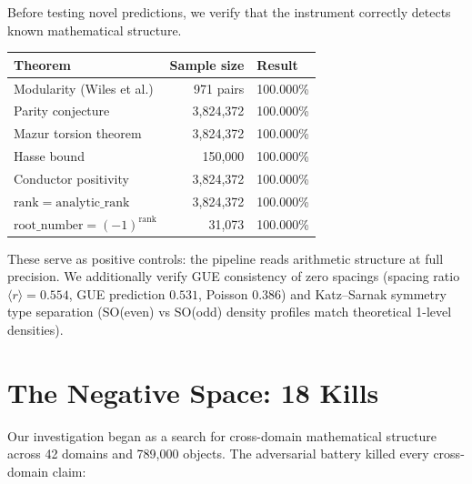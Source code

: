 \documentclass[11pt,a4paper]{article}
\begin{document}
Before testing novel predictions, we verify that the instrument correctly detects known mathematical structure.

\begin{center}
\begin{tabular}{lrl}
\toprule
\textbf{Theorem} & \textbf{Sample size} & \textbf{Result} \\
\midrule
Modularity (Wiles et al.) & 971 pairs & 100.000\% \\
Parity conjecture & 3,824,372 & 100.000\% \\
Mazur torsion theorem & 3,824,372 & 100.000\% \\
Hasse bound & 150,000 & 100.000\% \\
Conductor positivity & 3,824,372 & 100.000\% \\
$\mathrm{rank} = \mathrm{analytic\_rank}$ & 3,824,372 & 100.000\% \\
$\mathrm{root\_number} = (-1)^{\mathrm{rank}}$ & 31,073 & 100.000\% \\
\bottomrule
\end{tabular}
\end{center}

These serve as positive controls: the pipeline reads arithmetic structure at full precision. We additionally verify GUE consistency of zero spacings (spacing ratio $\langle r \rangle = 0.554$, GUE prediction $0.531$, Poisson $0.386$) and Katz--Sarnak symmetry type separation (SO(even) vs SO(odd) density profiles match theoretical 1-level densities).

\section{The Negative Space: 18 Kills}
\label{sec:kills}

Our investigation began as a search for cross-domain mathematical structure across 42 domains and 789,000 objects. The adversarial battery killed every cross-domain claim:
\end{document}
